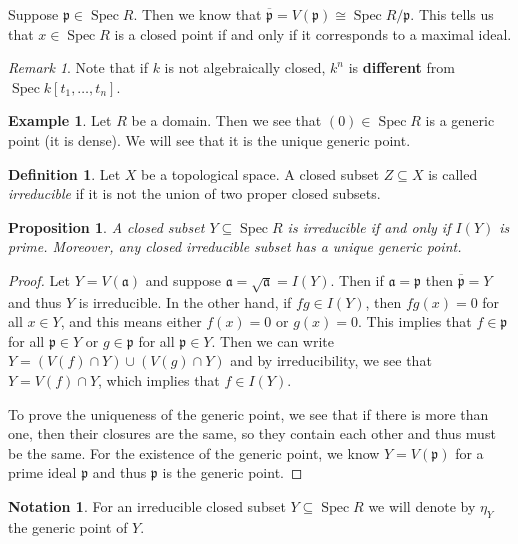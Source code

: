 \documentclass[leqno, openany]{memoir}
\newtheorem{prop}[thm]{Proposition}
\theoremstyle{definition}
\newtheorem{defn}[thm]{Definition}
\newtheorem{exm}[thm]{Example}
\newtheorem{notn}[thm]{Notation}
\theoremstyle{remark}
\newtheorem{rmk}[thm]{Remark}
\theoremstyle{plain}
\theoremstyle{definition}
\theoremstyle{remark}
\newcommand{\mf}[1]{\mathfrak{#1}}
\newcommand{\ol}[1]{\overline{#1}}
\DeclareMathOperator{\Spec}{Spec}
\begin{document}
Suppose $\mf{p} \in \Spec R$. Then we know that $\ol{\mf{p}} = V(\mf{p}) \cong \Spec R/\mf{p}$. This tells us that $x \in \Spec R$ is a closed point if and only if it corresponds to a maximal ideal. 

\begin{rmk}
    Note that if $k$ is not algebraically closed, $k^n$ is \textbf{different} from $\Spec k[t_1, \ldots, t_n]$.  
\end{rmk}

\begin{exm}
    Let $R$ be a domain. Then we see that $(0) \in \Spec R$ is a generic point (it is dense). We will see that it is the unique generic point.
\end{exm}

\begin{defn}
    Let $X$ be a topological space. A closed subset $Z \subseteq X$ is called \textit{irreducible} if it is not the union of two proper closed subsets.  
\end{defn}

\begin{prop}
    A closed subset $Y \subseteq \Spec R$ is irreducible if and only if $I(Y)$ is prime. Moreover, any closed irreducible subset has a unique generic point.
\end{prop}

\begin{proof}
    Let $Y = V(\mf{a})$ and suppose $\mf{a} = \sqrt{\mf{a}} = I(Y)$. Then if $\mf{a} = \mf{p}$ then $\ol{\mf{p}} = Y$ and thus $Y$ is irreducible. In the other hand, if $fg \in I(Y)$, then $fg(x) = 0$ for all $x \in Y$, and this means either $f(x) = 0$ or $g(x) = 0$. This implies that $f \in \mf{p}$ for all $\mf{p} \in Y$ or $g \in \mf{p}$ for all $\mf{p} \in Y$. Then we can write $Y = ( V(f) \cap Y ) \cup ( V(g) \cap Y )$ and by irreducibility, we see that $Y = V(f) \cap Y$, which implies that $f \in I(Y)$.

    To prove the uniqueness of the generic point, we see that if there is more than one, then their closures are the same, so they contain each other and thus must be the same. For the existence of the generic point, we know $Y = V(\mf{p})$ for a prime ideal $\mf{p}$ and thus $\mf{p}$ is the generic point.
\end{proof}

\begin{notn}
For an irreducible closed subset $Y \subseteq \Spec R$ we will denote by $\eta_Y$ the generic point of $Y$.
\end{notn}
\end{document}
